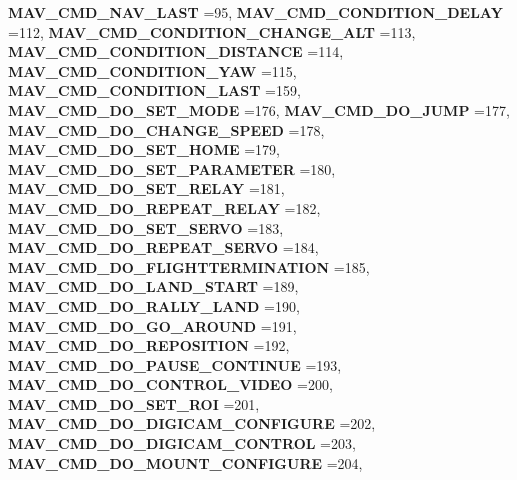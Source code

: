\begin{DoxyCompactItemize}
\textbf{ M\+A\+V\+\_\+\+C\+M\+D\+\_\+\+N\+A\+V\+\_\+\+L\+A\+ST} =95, 
\textbf{ M\+A\+V\+\_\+\+C\+M\+D\+\_\+\+C\+O\+N\+D\+I\+T\+I\+O\+N\+\_\+\+D\+E\+L\+AY} =112, 
\textbf{ M\+A\+V\+\_\+\+C\+M\+D\+\_\+\+C\+O\+N\+D\+I\+T\+I\+O\+N\+\_\+\+C\+H\+A\+N\+G\+E\+\_\+\+A\+LT} =113, 
\newline
\textbf{ M\+A\+V\+\_\+\+C\+M\+D\+\_\+\+C\+O\+N\+D\+I\+T\+I\+O\+N\+\_\+\+D\+I\+S\+T\+A\+N\+CE} =114, 
\textbf{ M\+A\+V\+\_\+\+C\+M\+D\+\_\+\+C\+O\+N\+D\+I\+T\+I\+O\+N\+\_\+\+Y\+AW} =115, 
\textbf{ M\+A\+V\+\_\+\+C\+M\+D\+\_\+\+C\+O\+N\+D\+I\+T\+I\+O\+N\+\_\+\+L\+A\+ST} =159, 
\textbf{ M\+A\+V\+\_\+\+C\+M\+D\+\_\+\+D\+O\+\_\+\+S\+E\+T\+\_\+\+M\+O\+DE} =176, 
\newline
\textbf{ M\+A\+V\+\_\+\+C\+M\+D\+\_\+\+D\+O\+\_\+\+J\+U\+MP} =177, 
\textbf{ M\+A\+V\+\_\+\+C\+M\+D\+\_\+\+D\+O\+\_\+\+C\+H\+A\+N\+G\+E\+\_\+\+S\+P\+E\+ED} =178, 
\textbf{ M\+A\+V\+\_\+\+C\+M\+D\+\_\+\+D\+O\+\_\+\+S\+E\+T\+\_\+\+H\+O\+ME} =179, 
\textbf{ M\+A\+V\+\_\+\+C\+M\+D\+\_\+\+D\+O\+\_\+\+S\+E\+T\+\_\+\+P\+A\+R\+A\+M\+E\+T\+ER} =180, 
\newline
\textbf{ M\+A\+V\+\_\+\+C\+M\+D\+\_\+\+D\+O\+\_\+\+S\+E\+T\+\_\+\+R\+E\+L\+AY} =181, 
\textbf{ M\+A\+V\+\_\+\+C\+M\+D\+\_\+\+D\+O\+\_\+\+R\+E\+P\+E\+A\+T\+\_\+\+R\+E\+L\+AY} =182, 
\textbf{ M\+A\+V\+\_\+\+C\+M\+D\+\_\+\+D\+O\+\_\+\+S\+E\+T\+\_\+\+S\+E\+R\+VO} =183, 
\textbf{ M\+A\+V\+\_\+\+C\+M\+D\+\_\+\+D\+O\+\_\+\+R\+E\+P\+E\+A\+T\+\_\+\+S\+E\+R\+VO} =184, 
\newline
\textbf{ M\+A\+V\+\_\+\+C\+M\+D\+\_\+\+D\+O\+\_\+\+F\+L\+I\+G\+H\+T\+T\+E\+R\+M\+I\+N\+A\+T\+I\+ON} =185, 
\textbf{ M\+A\+V\+\_\+\+C\+M\+D\+\_\+\+D\+O\+\_\+\+L\+A\+N\+D\+\_\+\+S\+T\+A\+RT} =189, 
\textbf{ M\+A\+V\+\_\+\+C\+M\+D\+\_\+\+D\+O\+\_\+\+R\+A\+L\+L\+Y\+\_\+\+L\+A\+ND} =190, 
\textbf{ M\+A\+V\+\_\+\+C\+M\+D\+\_\+\+D\+O\+\_\+\+G\+O\+\_\+\+A\+R\+O\+U\+ND} =191, 
\newline
\textbf{ M\+A\+V\+\_\+\+C\+M\+D\+\_\+\+D\+O\+\_\+\+R\+E\+P\+O\+S\+I\+T\+I\+ON} =192, 
\textbf{ M\+A\+V\+\_\+\+C\+M\+D\+\_\+\+D\+O\+\_\+\+P\+A\+U\+S\+E\+\_\+\+C\+O\+N\+T\+I\+N\+UE} =193, 
\textbf{ M\+A\+V\+\_\+\+C\+M\+D\+\_\+\+D\+O\+\_\+\+C\+O\+N\+T\+R\+O\+L\+\_\+\+V\+I\+D\+EO} =200, 
\textbf{ M\+A\+V\+\_\+\+C\+M\+D\+\_\+\+D\+O\+\_\+\+S\+E\+T\+\_\+\+R\+OI} =201, 
\newline
\textbf{ M\+A\+V\+\_\+\+C\+M\+D\+\_\+\+D\+O\+\_\+\+D\+I\+G\+I\+C\+A\+M\+\_\+\+C\+O\+N\+F\+I\+G\+U\+RE} =202, 
\textbf{ M\+A\+V\+\_\+\+C\+M\+D\+\_\+\+D\+O\+\_\+\+D\+I\+G\+I\+C\+A\+M\+\_\+\+C\+O\+N\+T\+R\+OL} =203, 
\textbf{ M\+A\+V\+\_\+\+C\+M\+D\+\_\+\+D\+O\+\_\+\+M\+O\+U\+N\+T\+\_\+\+C\+O\+N\+F\+I\+G\+U\+RE} =204, 

\end{DoxyCompactItemize}

